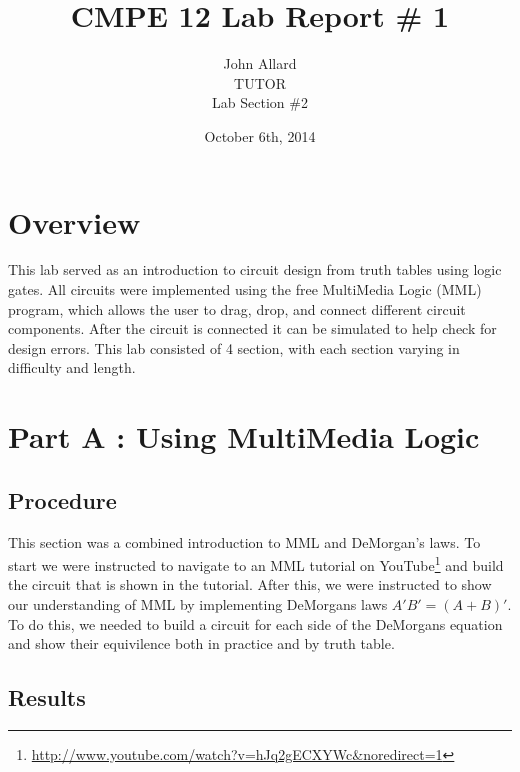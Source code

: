 \documentclass[a4paper,11pt]{article}
\title{ CMPE 12 Lab Report \# 1 \\[7 in]}
\author{John Allard \\ TUTOR \\ Lab Section \#2}
\date{October 6th, 2014}
\begin{document}
\maketitle
\newpage


\section{Overview}
This lab served as an introduction to circuit design from truth tables using logic gates. All circuits were implemented using the free MultiMedia Logic (MML) program, which allows the user to drag, drop, and connect different circuit components. After the circuit is connected it can be simulated to help check for design errors. This lab consisted of 4 section, with each section varying in difficulty and length. 




\section{Part A : Using MultiMedia Logic}
\subsection{Procedure}
This section was a combined introduction to MML and DeMorgan's laws. To start we were instructed to navigate to an MML tutorial on YouTube\footnote{\url{http://www.youtube.com/watch?v=hJq2gECXYWc&noredirect=1}} and build the circuit that is shown in the tutorial. After this, we were instructed to show our understanding of MML by implementing DeMorgans laws \(A'B' = (A+B)'\). To do this, we needed to build a circuit for each side of the DeMorgans equation and show their equivilence both in practice and by truth table. 
\subsection{Results}
\end{document}
